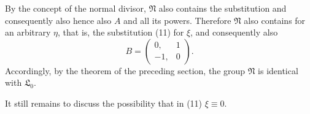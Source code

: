 By the concept of the normal divisor, $\mathfrak{N}$ also contains the substitution
and consequently also
hence also $A$ and all its powers. Therefore $\mathfrak{N}$ also contains
for an arbitrary $\eta$, that is, the substitution (11) for  $\xi$, and consequently also
\[
B = \begin{pmatrix} 0, & 1 \\ -1, & 0 \end{pmatrix}.
\]
Accordingly, by the theorem of the preceding section, the group $\mathfrak{N}$ is identical with $\mathfrak{L}_0$.

It still remains to discuss the possibility that in (11) $\xi \equiv 0$.

